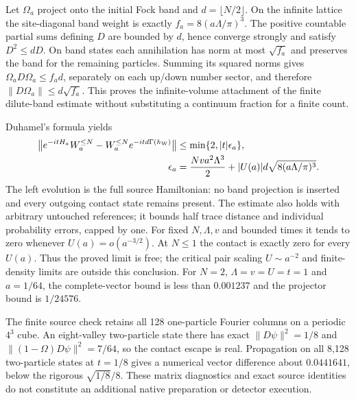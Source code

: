 Let $\Omega_a$ project onto the initial Fock band and
$d=\lfloor N/2\rfloor$.  On the infinite lattice the site-diagonal band
weight is exactly $f_a=8(a\Lambda/\pi)^3$.  The positive countable
partial sums defining $D$ are bounded by $d$, hence converge strongly
and satisfy $D^2\le dD$.  On band states each annihilation has norm at
most $\sqrt{f_a}$ and preserves the band for the remaining particles.
Summing its squared norms gives
$\Omega_aD\Omega_a\le f_a d$, separately on each up/down number sector,
and therefore $\|D\Omega_a\|\le d\sqrt{f_a}$.
This proves the infinite-volume attachment of the finite dilute-band
estimate without substituting a continuum fraction for a finite count.

Duhamel's formula yields
\[
 \begin{split}
 \big\|e^{-itH_a}W_a^{\le N}
       -W_a^{\le N}e^{-itd\Gamma(h_{\rm W})}\big\|
 &\le\min\{2,|t|\epsilon_a\},\\
 \epsilon_a&=\frac{Nva^2\Lambda^3}{2}
       +|U(a)|d\sqrt{8(a\Lambda/\pi)^3}.
 \end{split}
\]
The left evolution is the full source Hamiltonian: no band projection is
inserted and every outgoing contact state remains present.  The estimate
also holds with arbitrary untouched references; it bounds half trace
distance and individual probability errors, capped by one.
For fixed $N,\Lambda,v$ and bounded times it tends to zero whenever
$U(a)=o(a^{-3/2})$.  At $N\le1$ the contact is exactly zero for every
$U(a)$.  Thus the proved limit is free; the critical pair scaling
$U\sim a^{-2}$ and finite-density limits are outside this conclusion.
For $N=2$, $\Lambda=v=U=t=1$ and $a=1/64$, the complete-vector bound
is less than $0.001237$ and the projector bound is $1/24576$.

The finite source check retains all 128 one-particle Fourier columns on
a periodic $4^3$ cube.  An eight-valley two-particle state there has exact
$\|D\psi\|^2=1/8$ and
$\|(1-\Omega)D\psi\|^2=7/64$, so the contact escape is real.
Propagation on all 8,128 two-particle states at $t=1/8$ gives a numerical
vector difference about $0.0441641$, below the rigorous
$\sqrt{1/8}/8$.  These matrix diagnostics and exact source identities
do not constitute an additional native preparation or detector execution.

